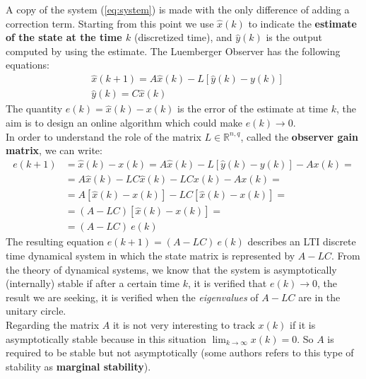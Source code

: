 A copy of the system (\ref{eq:system}) is made with the only difference of adding a correction term. Starting from this point we use $\hat{x}(k)$ to indicate the \textbf{estimate of the state at the time $k$} (discretized time), and $\hat{y}(k)$ is the output computed by using the estimate. The Luemberger Observer has the following equations: 
\begin{equation} \label{eq: Luemberger}
	\begin{aligned}
			&\hat{x}(k+1)=A\hat{x}(k)-L[\hat{y}(k)-y(k)]\\
		&\hat{y}(k)=C\hat{x}(k)
	\end{aligned}
\end{equation}
The quantity $e(k)=\hat{x}(k)-x(k)$ is the error of the estimate at time $k$, the aim is to design an online algorithm which could make $e(k)\rightarrow 0 $. \\
In order to understand the role of the matrix $L\in \mathbb{R}^{n,q}$,  called the \textbf{observer gain matrix}, we can write: 
\begin{align}
	e(k+1)&=\hat{x}(k)-x(k)=A\hat{x}(k)-L[\hat{y}(k)-y(k)]-Ax(k)=\\
	&=A\hat{x}(k)-LC\hat{x}(k)-LCx(k)-Ax(k)=\\
	&=A[\hat{x}(k)-x(k)]-LC[\hat{x}(k)-x(k)]=\\
	&=(A-LC) [\hat{x}(k)-x(k)]=\\
	&=(A-LC) \ e(k)	
\end{align}
The resulting equation $e(k+1)=(A-LC)\ e(k)$ describes an LTI discrete time dynamical system in which the state matrix is represented by $A-LC$. From the theory of dynamical systems, we know that the system is asymptotically (internally) stable if after a certain time $k$, it is verified that $e(k)\rightarrow 0$, the result we are seeking, it is verified when the \textit{eigenvalues} of $A-LC$ are in the unitary circle. \\

Regarding the matrix $A$ it is not very interesting to track $x(k)$ if it is asymptotically stable because in this situation $\lim_{k \to \infty} x(k)=0$. So $A$ is required to be stable but not asymptotically (some authors refers to this type of stability as \textbf{marginal stability}).\\

\hspace*{-5mm}

